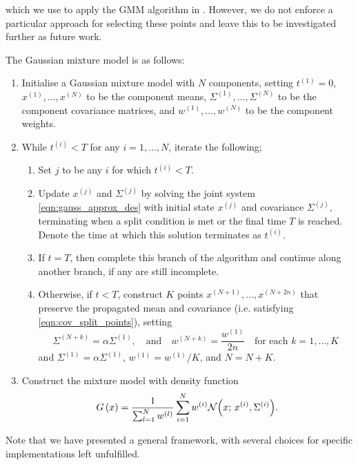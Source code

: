 which we use to apply the GMM algorithm in .
However, we do not enforce a particular approach for selecting these points and leave this to be investigated further as future work.



The Gaussian mixture model is as follows:
\begin{enumerate}
	\item Initialise a Gaussian mixture model with \(N\) components, setting \(t^{(1)} = 0\), \(x^{(1)},\dotsc, x^{(N)}\) to be the component means, \(\Sigma^{(1)}, \dotsc, \Sigma^{(N)}\) to be the component covariance matrices, and \(w^{(1)}, \dotsc, w^{(N)}\) to be the component weights.

	\item While \(t^{(i)} < T\) for any \(i = 1,\dotsc, N\), iterate the following;

	      \begin{enumerate}
		      \item Set \(j\) to be any \(i\) for which \(t^{(i)} < T\).

		      \item Update \(x^{(j)}\) and \(\Sigma^{(j)}\) by solving the joint system \cref{eqn:gauss_approx_des} with initial state \(x^{(j)}\) and covariance \(\Sigma^{(j)}\), terminating when a split condition is met or the final time \(T\) is reached.
		            Denote the time at which this solution terminates as \(t^{(i)}\).

		      \item If \(t = T\), then complete this branch of the algorithm and continue along another branch, if any are still incomplete.

					\item Otherwise, if \(t < T\), construct \(K\) points \(x^{(N + 1)},\dotsc,x^{(N + 2n)}\) that preserve the propagated mean and covariance (i.e. satisfying \cref{eqn:cov_split_points}), setting
		            \[
			            \Sigma^{(N + k)} = \alpha \Sigma^{(1)}, \quad \text{and} \quad w^{(N + k)} = \frac{w^{(1)}}{2n} \quad \text{for each } k = 1,\dotsc,K
		            \]
		            and \(\Sigma^{(1)} = \alpha \Sigma^{(1)}\), \(w^{(1)} = w^{(1)} / K\), and \(N = N + K\).
	      \end{enumerate}

	\item Construct the mixture model with density function
	      \[
		      G\left(x\right) = \frac{1}{\sum_{l=1}^{N}w^{(l)}}\sum_{i=1}^{N}{w^{(i)}\mathcal{N}\!\left(x; \, x^{(i)}, \Sigma^{(i)}\right)}.
	      \]

\end{enumerate}
Note that we have presented a general framework, with several choices for specific implementations left unfulfilled.


